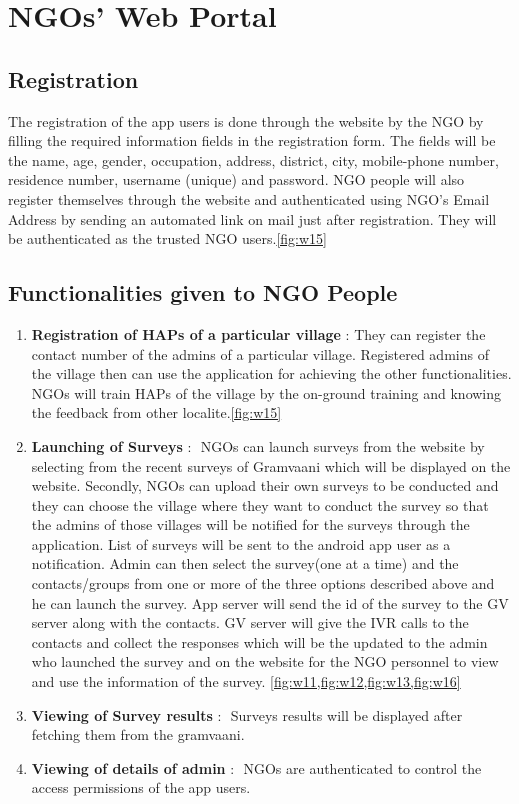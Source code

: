 \chapter{NGOs' Web Portal}


\section{Registration}
The registration of the app users is done through the website by the NGO by filling the
required information fields in the registration form. The fields will be the name, age,
gender, occupation, address, district, city, mobile-phone number, residence number,
username (unique) and password.
NGO people will also register themselves through the website and authenticated using
NGO’s Email Address by sending an automated link on mail just after registration. They
will be authenticated as the trusted NGO users.\ref{fig:w15}

\section{Functionalities given to NGO People}

\begin{enumerate}
\item \textbf{Registration of HAPs of a particular village} : ​
They can register the contact
number of the admins of a particular village. Registered admins of the village then
can use the application for achieving the other functionalities. NGOs will train HAPs
of the village by the on-ground training and knowing the feedback from other
localite.\ref{fig:w15}
\ \\
\item \textbf{Launching of Surveys} : ​
NGOs can launch surveys from the website by selecting
from the recent surveys of Gramvaani which will be displayed on the website.
Secondly, NGOs can upload their own surveys to be conducted and they can choose
the village where they want to conduct the survey so that the admins of those
villages will be notified for the surveys through the application. List of surveys will
be sent to the android app user as a notification. Admin can then select the
survey(one at a time) and the contacts/groups from one or more of the three
options described above and he can launch the survey. App server will send the id of
the survey to the GV server along with the contacts. GV server will give the IVR
calls to the contacts and collect the responses which will be the updated to the
admin who launched the survey and on the website for the NGO personnel to view
and use the information of the survey. \ref{fig:w11,fig:w12,fig:w13,fig:w16}
\ \\
\item \textbf{Viewing of Survey results} : ​
Surveys results will be displayed after fetching them
from the gramvaani.
\ \\
\item \textbf{Viewing of details of admin} : ​
NGOs are authenticated to control the access
permissions of the app users.

\end{enumerate}
